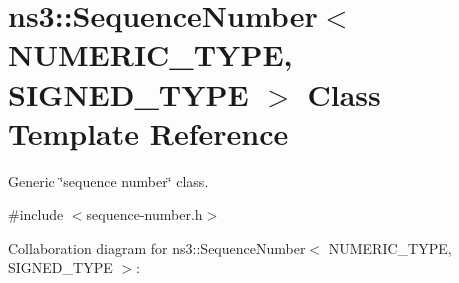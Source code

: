 \hypertarget{classns3_1_1SequenceNumber}{}\section{ns3\+:\+:Sequence\+Number$<$ N\+U\+M\+E\+R\+I\+C\+\_\+\+T\+Y\+PE, S\+I\+G\+N\+E\+D\+\_\+\+T\+Y\+PE $>$ Class Template Reference}
\label{classns3_1_1SequenceNumber}


Generic \char`\"{}sequence number\char`\"{} class.  




{\ttfamily \#include $<$sequence-\/number.\+h$>$}



Collaboration diagram for ns3\+:\+:Sequence\+Number$<$ N\+U\+M\+E\+R\+I\+C\+\_\+\+T\+Y\+PE, S\+I\+G\+N\+E\+D\+\_\+\+T\+Y\+PE $>$\+:
